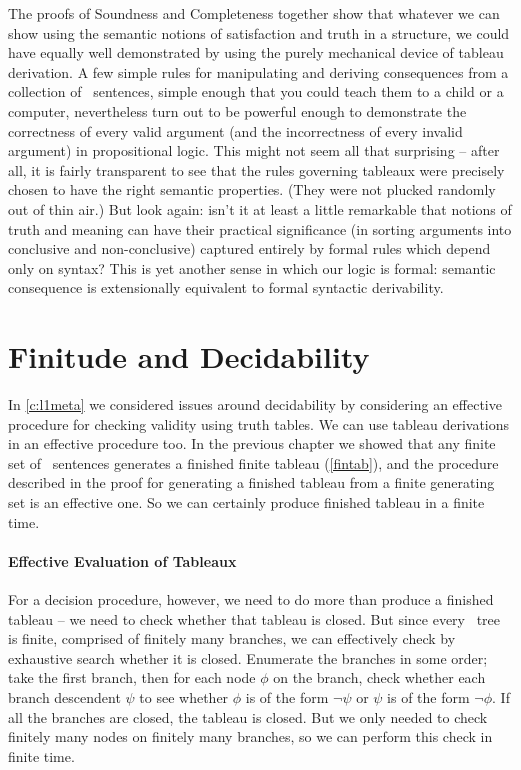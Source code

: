 The proofs of Soundness and Completeness together show that whatever we can show using the semantic notions of satisfaction and truth in a structure, we could have equally well demonstrated by using the purely mechanical device of tableau derivation. A few simple rules for manipulating and deriving consequences from a collection of \lone\ sentences, simple enough that you could teach them to a child or a computer, nevertheless turn out to be powerful enough to demonstrate the correctness of every valid argument (and the incorrectness of every invalid argument) in propositional logic. This might not seem all that surprising – after all, it is fairly transparent to see that the rules governing tableaux were precisely chosen to have the right semantic properties. (They were not plucked randomly out of thin air.) But look again: isn't it at least a little remarkable that notions of truth and meaning can have their practical significance (in sorting arguments into conclusive and non-conclusive) captured entirely by formal rules which depend only on syntax? This is yet another sense in which our logic is formal: semantic consequence is extensionally equivalent to formal syntactic derivability. 


\section{Finitude and Decidability}

In \autoref{c:l1meta} we considered issues around decidability by considering an effective procedure for checking validity using truth tables. We can use tableau derivations in an effective procedure too. 
In the previous chapter we showed that any finite set of \lone\ sentences generates a finished finite tableau (\autoref{fintab}), and the procedure described in the proof for generating a finished tableau from a finite generating set is an effective one. So we can certainly produce finished tableau in a finite time.

\paragraph{Effective Evaluation of Tableaux} For a decision procedure, however, we need to do more than produce a finished tableau – we need to check whether that tableau is closed. But since every \lone\ tree is finite, comprised of finitely many branches, we can effectively check by exhaustive search whether it is closed. Enumerate the branches in some order; take the first branch, then for each node $\phi$ on the branch, check whether each branch descendent $\psi$ to see whether $\phi$ is of the form $¬ \psi$ or $\psi$ is of the form $¬ \phi$. If all the branches are closed, the tableau is closed. But we only needed to check finitely many nodes on finitely many branches, so we can perform this check in finite time.

